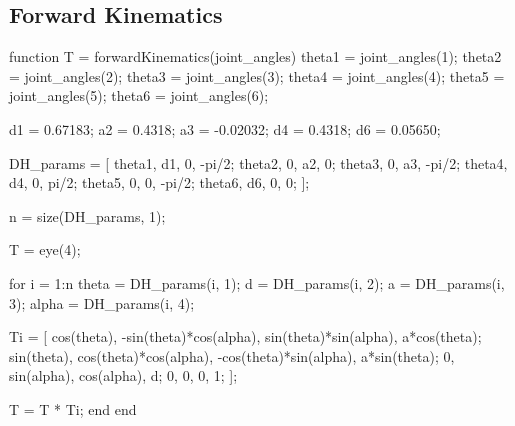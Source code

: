 \documentclass[conference]{IEEEtran}
\begin{document}
\subsection{Forward Kinematics}
\label{appendix:ForwardKinCode}
\begin{matlabcode}[label={ForwardKinCodeAppendix}]
function T = forwardKinematics(joint_angles)
    theta1 = joint_angles(1);
    theta2 = joint_angles(2);
    theta3 = joint_angles(3);
    theta4 = joint_angles(4);
    theta5 = joint_angles(5);
    theta6 = joint_angles(6);

    
    d1 = 0.67183;   %
    a2 = 0.4318;    %
    a3 = -0.02032;  %
    d4 = 0.4318;    %
    d6 = 0.05650;   %

    DH_params = [
        theta1, d1, 0, -pi/2;
        theta2, 0, a2, 0;
        theta3, 0, a3, -pi/2;
        theta4, d4, 0, pi/2;
        theta5, 0, 0, -pi/2;
        theta6, d6, 0, 0;
    ];
    
    n = size(DH_params, 1);
    
    T = eye(4);
    
    for i = 1:n
        theta = DH_params(i, 1);
        d = DH_params(i, 2);
        a = DH_params(i, 3);
        alpha = DH_params(i, 4);
        
        Ti = [
            cos(theta), -sin(theta)*cos(alpha),  sin(theta)*sin(alpha), a*cos(theta);
            sin(theta),  cos(theta)*cos(alpha), -cos(theta)*sin(alpha), a*sin(theta);
            0,           sin(alpha),             cos(alpha),            d;
            0,           0,                      0,                     1;
        ];
        
        T = T * Ti;
    end
end
\end{matlabcode}
\end{document}
